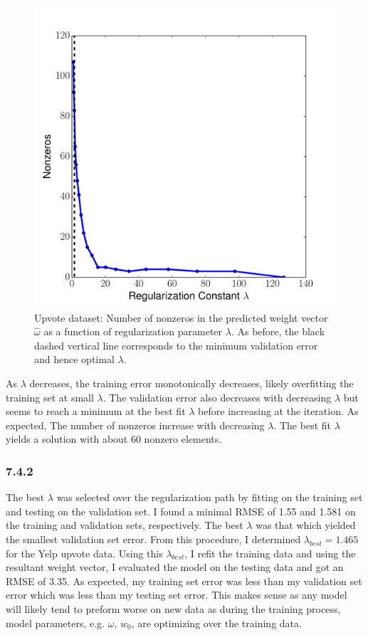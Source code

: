 \documentclass[12pt]{amsart}
\begin{document}
\begin{figure}[H]
	\includegraphics[width=\columnwidth]{upvote_nonzeros.pdf}
    \caption{Upvote dataset: Number of nonzeros in the predicted weight vector $\hat{\omega}$ as a function of regularization parameter $\lambda$.  As before, the black dashed vertical line corresponds to the minimum validation error and hence optimal $\lambda$.}
    \label{fig:yelp_upvote_nonzeros}
\end{figure}

As $\lambda$ decreases, the training error monotonically decreases, likely overfitting the training set at small $\lambda$.  The validation error also decreases with decreasing $\lambda$ but seems to reach a minimum at the best fit $\lambda$ before increasing at the iteration.  As expected, The number of nonzeros increase with decreasing $\lambda$.  The best fit $\lambda$ yields a solution with about 60 nonzero elements.

\subsubsection*{7.4.2}

The best $\lambda$ was selected over the regularization path by fitting on the training set and testing on the validation set.  I found a minimal RMSE of 1.55 and 1.581 on the training and validation sets, respectively.  The best $\lambda$ was that which yielded the smallest validation set error.  From this procedure, I determined $\lambda_{best} = 1.465$ for the Yelp upvote data.  Using this $\lambda_{best}$, I refit the training data and using the resultant weight vector, I evaluated the model on the testing data and got an RMSE of 3.35.  As expected, my training set error was less than my validation set error which was less than my testing set error.  This makes sense as any model will likely tend to preform worse on new data as during the training process, model parameters, e.g. $\omega$, $w_0$, are optimizing over the training data.
\end{document}
